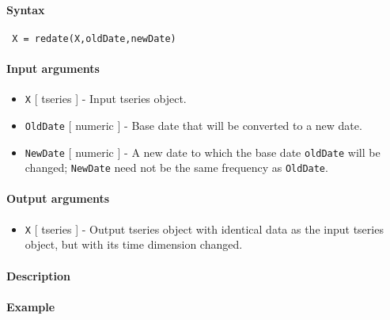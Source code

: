 


	\paragraph{Syntax}
 
 \begin{verbatim}
 X = redate(X,oldDate,newDate)
 \end{verbatim}
 
 \paragraph{Input arguments}
 
 \begin{itemize}
 \item
   \texttt{X} {[} tseries {]} - Input tseries object.
 \item
   \texttt{OldDate} {[} numeric {]} - Base date that will be converted to
   a new date.
 \item
   \texttt{NewDate} {[} numeric {]} - A new date to which the base date
   \texttt{oldDate} will be changed; \texttt{NewDate} need not be the
   same frequency as \texttt{OldDate}.
 \end{itemize}
 
 \paragraph{Output arguments}
 
 \begin{itemize}
 \item
   \texttt{X} {[} tseries {]} - Output tseries object with identical data
   as the input tseries object, but with its time dimension changed.
 \end{itemize}
 
 \paragraph{Description}
 
 \paragraph{Example}


